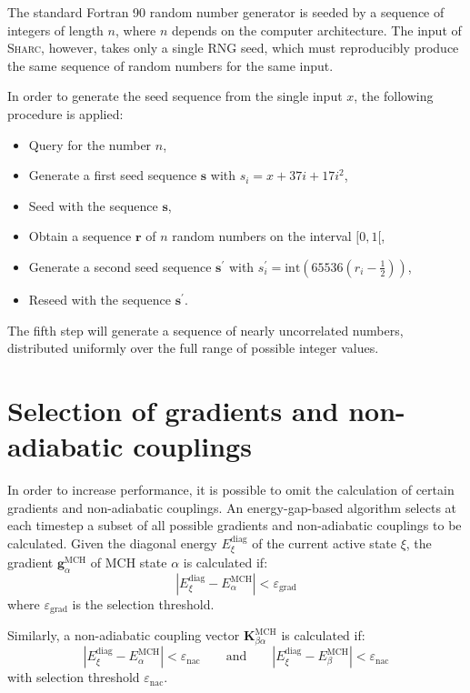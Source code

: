 \documentclass[a4paper,11pt,DIV=15,openany,twoside=false]{scrbook}
\newcommand{\sharc}{\textsc{Sharc}}
\renewcommand{\vec}[1]{\ensuremath{\mathbf{#1}}}
\begin{document}
The standard Fortran 90 random number generator is seeded by a sequence of integers of length $n$, where $n$ depends on the computer architecture. The input of \sharc, however, takes only a single RNG seed, which must reproducibly produce the same sequence of random numbers for the same input.

In order to generate the seed sequence from the single input $x$, the following procedure is applied:
\begin{itemize}
  \item Query for the number $n$,
  \item Generate a first seed sequence $\vec{s}$ with $s_i=x+37i+17i^2$,
  \item Seed with the sequence $\vec{s}$,
  \item Obtain a sequence $\vec{r}$ of $n$ random numbers on the interval $[0,1[$,
  \item Generate a second seed sequence $\vec{s}^\prime$ with $s_i^\prime=\text{int}\left(65536(r_i-\frac{1}{2})\right)$,
  \item Reseed with the sequence $\vec{s}^\prime$.
\end{itemize}
The fifth step will generate a sequence of nearly uncorrelated numbers, distributed uniformly over the full range of possible integer values. 


\section{Selection of gradients and non-adiabatic couplings}\label{met:selection}

In order to increase performance, it is possible to omit the calculation of certain gradients and non-adiabatic couplings. An energy-gap-based algorithm selects at each timestep a subset of all possible gradients and non-adiabatic couplings to be calculated. Given the diagonal energy $E^{\text{diag}}_\xi$ of the current active state $\xi$, the gradient $\vec{g}^{\text{MCH}}_\alpha$ of MCH state $\alpha$ is calculated if:
\begin{equation}
  \left|
    E^{\text{diag}}_\xi - E^{\text{MCH}}_\alpha
  \right|
  <
  \varepsilon_\text{grad}
\end{equation}
where $\varepsilon_\text{grad}$ is the selection threshold.

Similarly, a non-adiabatic coupling vector $\vec{K}^{\text{MCH}}_{\beta\alpha}$ is calculated if:
\begin{equation}
  \left|
    E^{\text{diag}}_\xi - E^{\text{MCH}}_\alpha
  \right|
  <
  \varepsilon_\text{nac}
  \qquad\text{and}\qquad
  \left|
    E^{\text{diag}}_\xi - E^{\text{MCH}}_\beta
  \right|
  <
  \varepsilon_\text{nac}
\end{equation}
with selection threshold $\varepsilon_\text{nac}$.
\end{document}
